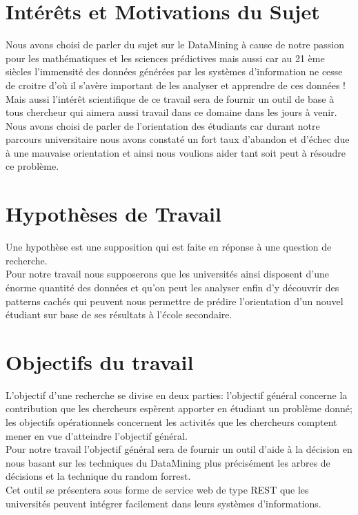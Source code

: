 \section{Intérêts et Motivations du Sujet}
Nous avons choisi de parler du sujet sur le DataMining à cause de notre passion pour les mathématiques et les sciences prédictives mais aussi car au 21 ème siècles l'immensité des données générées par les systèmes d'information ne cesse de croitre d'où il s'avère important de les analyser et apprendre de ces données !\\
Mais aussi l'intérêt scientifique de ce travail sera de fournir un outil de base à tous chercheur qui aimera aussi travail dans ce domaine dans les jours à venir. \\
Nous avons choisi de parler de l'orientation des étudiants car durant notre parcours universitaire nous avons constaté un fort taux d'abandon et d'échec due à une mauvaise orientation et ainsi nous voulions aider tant soit peut à résoudre ce problème. 
\section{Hypothèses de Travail}
Une hypothèse est  une supposition qui est faite en réponse à une question de recherche. \cite{MethFr} \\
Pour notre travail nous supposerons que les universités ainsi disposent d'une énorme quantité des données et qu'on peut les analyser enfin d'y découvrir des patterns cachés qui peuvent nous permettre de prédire l'orientation d'un nouvel étudiant sur base de ses résultats à l'école secondaire.     
\section{Objectifs du travail}
L'objectif d’une recherche se divise en deux parties: l'objectif général concerne la contribution que les chercheurs espèrent apporter en étudiant un problème donné; les objectifs opérationnels concernent les activités que les chercheurs comptent mener en vue
d'atteindre l'objectif général. \cite{MethFr} \\
Pour notre travail l'objectif général sera de fournir un outil d'aide à la décision en nous basant sur les techniques du DataMining plus précisément les arbres de décisions et la technique du random forrest.\\
Cet outil se présentera sous forme de service web de type \ac{REST} que les universités peuvent intégrer facilement dans leurs systèmes d'informations.
